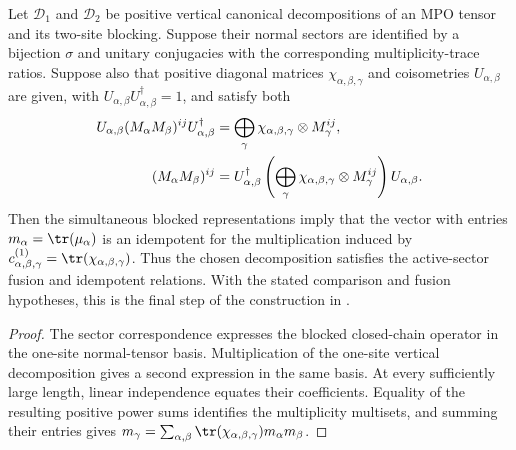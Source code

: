 \begin{lemma}%
    \label{thm:mpdo_paired_vertical_decompositions_fusion}
    \leanok
    Let $\mathcal D_1$ and $\mathcal D_2$ be positive vertical canonical
    decompositions of an MPO tensor and its two-site blocking. Suppose their
    normal sectors are identified by a bijection $\sigma$ and unitary
    conjugacies with the corresponding multiplicity-trace ratios. Suppose also
    that positive diagonal matrices $\chi_{\alpha,\beta,\gamma}$ and
    coisometries $U_{\alpha,\beta}$ are given, with
    $U_{\alpha,\beta}U_{\alpha,\beta}^{\dagger}=1$, and satisfy both
    \begin{align}
        U_{\alpha,\beta}(M_\alpha M_\beta)^{ij}
        U_{\alpha,\beta}^{\dagger}
         & =\bigoplus_\gamma
        \chi_{\alpha,\beta,\gamma}\otimes M_\gamma^{ij},
        \notag                         \\
        (M_\alpha M_\beta)^{ij}
         & =U_{\alpha,\beta}^{\dagger}
        \left(\bigoplus_\gamma
        \chi_{\alpha,\beta,\gamma}\otimes M_\gamma^{ij}\right)
        U_{\alpha,\beta}.
        \notag
    \end{align}
    Then the simultaneous blocked representations imply that the vector
    with entries $m_\alpha=\tr(\mu_\alpha)$ is an idempotent for the
    multiplication induced by
    $c^{(1)}_{\alpha,\beta,\gamma}=\tr(\chi_{\alpha,\beta,\gamma})$.
    Thus the chosen decomposition satisfies the active-sector fusion and
    idempotent relations. With the stated comparison and fusion hypotheses,
    this is the final step of the construction in
    \cite[Appendix~C.4, lines~2001--2046]{Cirac2016MPDO_arXiv}.
\end{lemma}
\begin{proof}\leanok
    The sector correspondence expresses the blocked closed-chain operator in
    the one-site normal-tensor basis. Multiplication of the one-site vertical
    decomposition gives a second expression in the same basis. At every
    sufficiently large length, linear independence equates their
    coefficients. Equality of the resulting positive power sums identifies
    the multiplicity multisets, and summing their entries gives
    $m_\gamma=\sum_{\alpha,\beta}
        \tr(\chi_{\alpha,\beta,\gamma})m_\alpha m_\beta$.
\end{proof}

